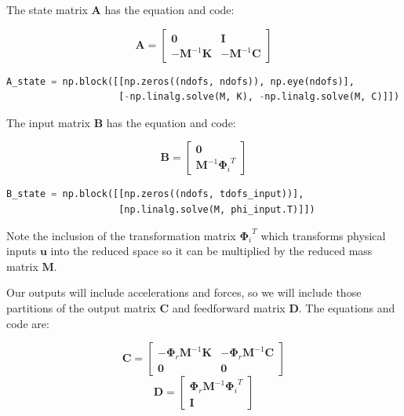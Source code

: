 \documentclass[pdf,12pt,report]{SANDreport}
\begin{document}
{{{{{{{    The state matrix $\mathbf{A}$ has the equation and code:
    
    \begin{equation}
        \mathbf{A} = \begin{bmatrix}
        \mathbf{0} & \mathbf{I} \\
        -\mathbf{M}^{-1}\mathbf{K} & -\mathbf{M}^{-1}\mathbf{C}
        \end{bmatrix}
    \end{equation}
    
    \begin{lstlisting}[language=Python]
A_state = np.block([[np.zeros((ndofs, ndofs)), np.eye(ndofs)],
                    [-np.linalg.solve(M, K), -np.linalg.solve(M, C)]])\end{lstlisting}
    
    The input matrix $\mathbf{B}$ has the equation and code:
    
    \begin{equation}
        \mathbf{B} = \begin{bmatrix}
        \mathbf{0} \\ \mathbf{M}^{-1}{\mathbf{\Phi}_i}^T
        \end{bmatrix}
    \end{equation}
    
    \begin{lstlisting}[language=Python]
B_state = np.block([[np.zeros((ndofs, tdofs_input))],
                    [np.linalg.solve(M, phi_input.T)]])\end{lstlisting}
                        
    Note the inclusion of the transformation matrix ${\mathbf{\Phi}_i}^T$ which transforms physical inputs $\mathbf{u}$ into the reduced space so it can be multiplied by the reduced mass matrix $\mathbf{M}$.
    
    Our outputs will include accelerations and forces, so we will include those partitions of the output matrix $\mathbf{C}$ and feedforward matrix $\mathbf{D}$.  The equations and code are:
    
    \begin{equation}
        \mathbf{C} = \begin{bmatrix}
        -\mathbf{\Phi}_r\mathbf{M}^{-1}\mathbf{K} & -\mathbf{\Phi}_r\mathbf{M}^{-1}\mathbf{C} \\
        \mathbf{0} & \mathbf{0}
        \end{bmatrix}
    \end{equation}
    \begin{equation}
        \mathbf{D} = \begin{bmatrix}
        \mathbf{\Phi}_r \mathbf{M}^{-1}{\mathbf{\Phi}_i}^T \\ \mathbf{I}
        \end{bmatrix}
    \end{equation}
    
}}}}}}}
\end{document}
